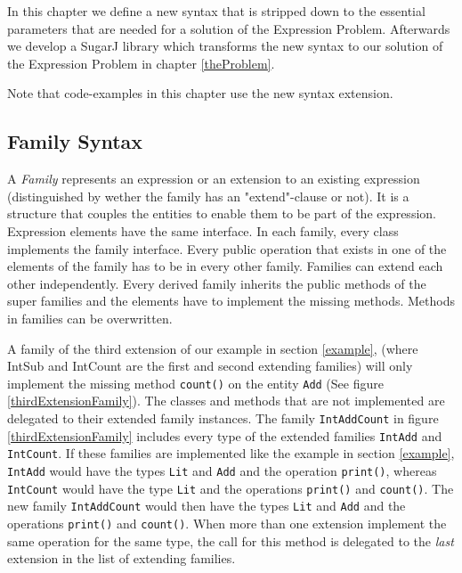 \documentclass{report}
\begin{document}
In this chapter we define a new syntax that is stripped down to the essential parameters that are needed for a solution of the Expression Problem. Afterwards we develop a SugarJ library which transforms the new syntax to our solution of the Expression Problem in chapter \ref{theProblem}.

Note that code-examples in this chapter use the new syntax extension.

\subsection{Family Syntax}

A \emph{Family} represents an expression or an extension to an existing expression (distinguished by wether the family has an "extend"-clause or not). It is a structure that couples the entities to enable them to be part of the expression. Expression elements have the same interface. In each family, every class implements the family interface. Every public operation that exists in one of the elements of the family has to be in every other family. Families can extend each other independently. Every derived family inherits the public methods of the super families and the elements have to implement the missing methods. Methods in families can be overwritten.

A family of the third extension of our example in section \ref{example}, (where IntSub and IntCount are the first and second extending families) will only implement the missing method \lstinline{count()} on the entity \lstinline{Add} (See figure \ref{thirdExtensionFamily}). The classes and methods that are not implemented are delegated to their extended family instances. The family \lstinline{IntAddCount} in figure \ref{thirdExtensionFamily} includes every type of the extended families \lstinline{IntAdd} and \lstinline{IntCount}. If these families are implemented like the example in section \ref{example}, \lstinline{IntAdd} would have the types \lstinline{Lit} and \lstinline{Add} and the operation \lstinline{print()}, whereas \lstinline{IntCount} would have the type \lstinline{Lit} and the operations \lstinline{print()} and \lstinline{count()}. The new family \lstinline{IntAddCount} would then have the types \lstinline{Lit} and \lstinline{Add} and the operations \lstinline{print()} and \lstinline{count()}. When more than one extension implement the same operation for the same type, the call for this method is delegated to the \emph{last} extension in the list of extending families.
\end{document}
